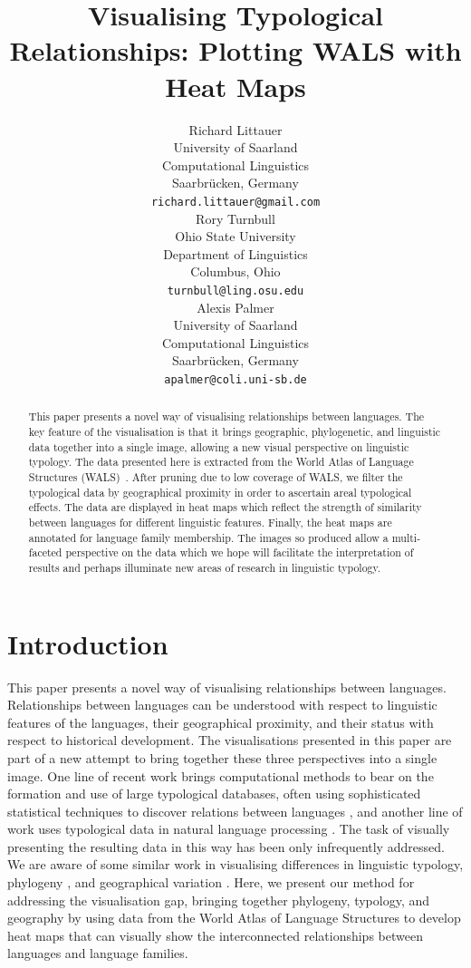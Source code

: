 \documentclass[11pt]{article}
\title{Visualising Typological Relationships: Plotting WALS with Heat Maps}
\author{Richard Littauer \\
 University of Saarland\\
 Computational Linguistics\\
 Saarbr\"ucken, Germany\\
   {\tt richard.littauer@gmail.com} \\\And
 Rory Turnbull \\
 Ohio State University\\
 Department of Linguistics\\
 Columbus, Ohio\\
   {\tt turnbull@ling.osu.edu} \\\AND
 Alexis Palmer\\
 University of Saarland\\
 Computational Linguistics\\
 Saarbr\"ucken, Germany\\
   {\tt apalmer@coli.uni-sb.de}\\}
\date{}
\begin{document}
\maketitle

\begin{abstract}
This paper presents a novel way of visualising relationships between languages. The key feature of the visualisation is that it brings geographic, phylogenetic, and linguistic data together into a single image, allowing a new visual perspective on linguistic typology. The data presented here is extracted from the World Atlas of Language Structures (WALS)~\cite{wals-2011}. After pruning due to low coverage of WALS, we filter the typological data by geographical proximity in order to ascertain areal typological effects. The data are displayed in heat maps which reflect the strength of similarity between languages for different linguistic features. Finally, the heat maps are annotated for language family membership. The images so produced allow a multi-faceted perspective on the data which we hope will facilitate the interpretation of results and perhaps illuminate new areas of research in linguistic typology.
\end{abstract}

\section{Introduction}
This paper presents a novel %
way of visualising relationships between languages. Relationships between languages can be understood with respect to linguistic features of the languages, their geographical proximity, and their status with respect to historical development. The visualisations presented in this paper are part of a new attempt %
to bring together these three perspectives into a single image. One line of recent work brings computational methods to bear on the formation and use of large typological databases, often using sophisticated statistical techniques to discover relations between languages \cite[among others]{cysouw2011,daume07implication,daume09areal}, and another line of work uses typological data in natural language processing \cite[for example]{georgi:etal:10,lewis:xia:08}. The task of visually presenting the resulting data in this way has been only infrequently addressed. We are aware of some similar work \cite{mayer:etal:2010,rohrdantz:etal:2010} in visualising differences in linguistic typology, phylogeny \cite{multitree}%
, and geographical variation \cite{10.1371/journal.pone.0023613}. %
 Here, we present our method for addressing the visualisation gap, bringing together phylogeny, typology, and geography %
 by using data from the World Atlas of Language Structures \cite{wals-2011} to develop heat maps that can visually show the interconnected relationships between languages and language families. 
\end{document}
